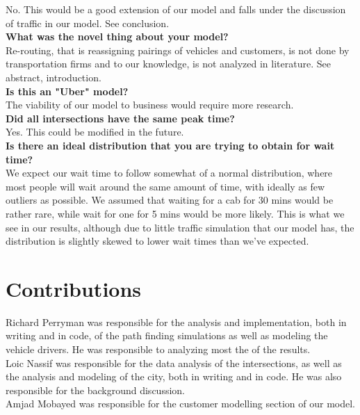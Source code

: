 \documentclass[Proceedings]{ascelike}
\begin{document}
No. This would be a good extension of our model and falls under the discussion of traffic in our model. See conclusion. \\

\textbf{What was the novel thing about your model?} \\

Re-routing, that is reassigning pairings of vehicles and customers, is not done by transportation firms and to our knowledge, is not analyzed in literature. See abstract, introduction.\\

\textbf{Is this an "Uber" model?} \\

The viability of our model to business would require more research. \\

\textbf{Did all intersections have the same peak time?}\\

Yes. This could be modified in the future. \\

\textbf{Is there an ideal distribution that you are trying to obtain for wait time?}\\

We expect our wait time to follow somewhat of a normal distribution, where most people will wait around the same amount of time, with ideally as few outliers as possible. We assumed that waiting for a cab for 30 mins would be rather rare, while wait for one for 5 mins would be more likely. This is what we see in our results, although due to little traffic simulation that our model has, the distribution is slightly skewed to lower wait times than we've expected. 

\appendix\label{section:contributions}

\section*{Contributions}

Richard Perryman was responsible for the analysis and implementation, both in writing and in code, of the path finding simulations as well as modeling the vehicle drivers. He was responsible to analyzing most the of the results. \\

Loic Nassif was responsible for the data analysis of the intersections, as well as the analysis and modeling of the city, both in writing and in code. He was also responsible for the background discussion. \\

Amjad Mobayed was responsible for the customer modelling section of our model. 

\appendix\label{section:references}
%
%

%
%
%
\end{document}
